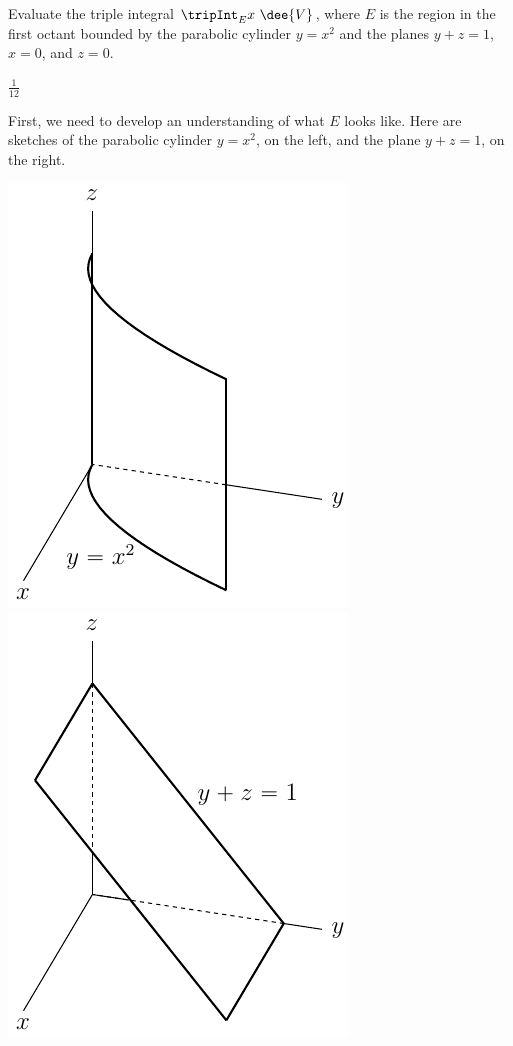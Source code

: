 \begin{question}[M200 2011D] %
Evaluate the triple integral $\tripInt_E x\ \dee{V}$, where $E$ is 
the region in the first octant bounded by the parabolic cylinder $y = x^2$ 
and the planes $y + z = 1$, $x = 0$, and $z = 0$.
\end{question}

%

\begin{answer}
$\frac{1}{12}$
\end{answer}

\begin{solution}
First, we need to develop an understanding of what $E$ looks like.
Here are sketches of the parabolic cylinder $y=x^2$, on the left,
and the plane $y+z=1$, on the right.
\begin{center}
     \includegraphics[scale=0.9]{fig/OE11D_7b.pdf}\qquad
     \includegraphics[scale=0.9]{fig/OE11D_7a.pdf}

\end{center}
\end{solution}
